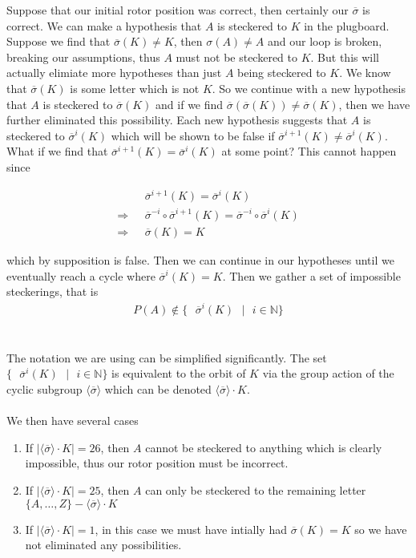 Suppose that our initial rotor position was correct, then certainly our $\overline{\sigma}$ is correct. We can make a hypothesis 
that $A$ is steckered to $K$ in the plugboard. Suppose we find that $\overline{\sigma}(K) \ne K$, then $\sigma(A)\ne A$ and our loop is broken, breaking our assumptions, thus $A$ must not be steckered to $K$.
But this will actually elimiate more hypotheses than just $A$ being steckered to $K$. We know that $\overline{\sigma}(K)$ is some letter which is not $K$. So we continue with a new hypothesis that $A$ is steckered to 
$\overline{\sigma}(K)$ and if we find $\overline{\sigma}(\overline{\sigma}(K)) \ne \overline{\sigma}(K)$, then we have further eliminated this possibility. 
Each new hypothesis suggests that $A$ is steckered to $\overline{\sigma}^{i}(K)$ which will be shown to be false if $\overline{\sigma}^{i+1}(K) \ne \overline{\sigma}^{i}(K)$. What if we find that 
$\overline{\sigma}^{i+1}(K) = \overline{\sigma}^i(K)$ at some point? This cannot happen since 
\begin{center}
        \begin{align*}
            &\overline{\sigma}^{i+1}(K) = \overline{\sigma}^i(K)
            \\\Rightarrow \text{ }&\overline{\sigma}^{-i}\circ\overline{\sigma}^{i+1}(K) = \overline\sigma^{-i}\circ\overline{\sigma}^i(K)
            \\\Rightarrow \text{ }&\overline{\sigma}(K) = K
        \end{align*}
\end{center}
which by supposition is false. Then we can continue in our hypotheses until we eventually reach a cycle where $\overline\sigma^i(K) = K$.
Then we gather a set of impossible steckerings, that is
\begin{align*}
    P(A) \notin \{\text{ }\overline{\sigma}^i(K)\text{ }\vert\text{ }i\in\mathbb{N}\}
\end{align*}
\\\\The notation we are using can be simplified significantly. The set $\{\text{ }\overline{\sigma}^i(K)\text{ }\vert\text{ }i\in\mathbb{N}\}$ is equivalent to the orbit of $K$ via the group action of the 
cyclic subgroup $\langle\overline{\sigma}\rangle$ which can be denoted $\langle\overline{\sigma}\rangle\cdot K$. 
\\\\We then have several cases 
\begin{enumerate}
    \item If $|\langle\overline{\sigma}\rangle\cdot K| = 26$, then $A$ cannot be steckered to anything which is clearly
    impossible, thus our rotor position must be incorrect. 
    \item If $|\langle\overline{\sigma}\rangle\cdot K| = 25$, then $A$ can only be steckered to the remaining letter \\$\{A,\dots,Z\} -
    \langle \overline{\sigma} \rangle\cdot K$
    \item If $|\langle\overline{\sigma}\rangle\cdot K| = 1$, in this case we must have intially had $\overline{\sigma}(K) = K$ so we have not
    eliminated any possibilities. 
\end{enumerate}